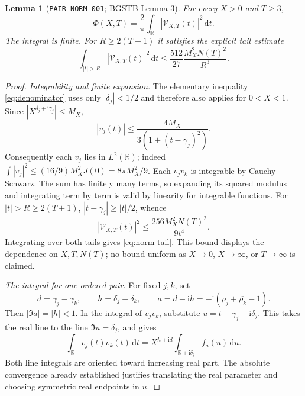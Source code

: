 \documentclass[11pt]{article}
\newtheorem{lemma}{Lemma}
\newcommand{\dd}{\,\mathrm d}
\newcommand{\ii}{\mathrm i}
\newcommand{\VS}{\mathcal V}
\begin{document}
\begin{lemma}[\texttt{PAIR-NORM-001}; BGSTB Lemma 3]\label{lem:pair-norm}
For every \(X>0\) and \(T\geq3\),
\begin{equation}\label{eq:pair-norm}
 \Phi(X,T)=\frac2\pi\int_{\mathbb R}|\VS_{X,T}(t)|^2\dd t.
\end{equation}
The integral is finite. For \(R\geq2(T+1)\) it satisfies the explicit
tail estimate
\begin{equation}\label{eq:norm-tail}
 \int_{|t|>R}|\VS_{X,T}(t)|^2\dd t
 \leq\frac{512}{27}\frac{M_X^2N(T)^2}{R^3}.
\end{equation}
\end{lemma}
\begin{proof}
\textit{Integrability and finite expansion.}
The elementary inequality \eqref{eq:denominator} uses only
\(|\delta_j|<1/2\) and therefore also applies for \(0<X<1\).
Since \(|X^{\delta_j+\ii\gamma_j}|\leq M_X\),
\[
 |v_j(t)|\leq\frac{4M_X}{3(1+(t-\gamma_j)^2)}.
\]
Consequently each \(v_j\) lies in \(L^2(\mathbb R)\); indeed
\(\int|v_j|^2\leq(16/9)M_X^2J(0)=8\pi M_X^2/9\).
Each \(v_j\overline{v_k}\) is integrable by Cauchy--Schwarz.
The sum has finitely many terms, so expanding its squared modulus and
integrating term by term is valid by linearity for integrable functions.
For \(|t|>R\geq2(T+1)\), \(|t-\gamma_j|\geq|t|/2\), whence
\[
 |\VS_{X,T}(t)|^2\leq\frac{256M_X^2N(T)^2}{9t^4}.
\]
Integrating over both tails gives \eqref{eq:norm-tail}.
This bound displays the dependence on \(X,T,N(T)\); no bound uniform
as \(X\to0\), \(X\to\infty\), or \(T\to\infty\) is claimed.

\textit{The integral for one ordered pair.}
For fixed \(j,k\), set
\[
 d=\gamma_j-\gamma_k,\qquad h=\delta_j+\delta_k,\qquad
 a=d-\ii h=-\ii(\rho_j+\overline{\rho_k}-1).
\]
Then \(|\Im a|=|h|<1\). In the integral of
\(v_j\overline{v_k}\), substitute \(u=t-\gamma_j+\ii\delta_j\).
This takes the real line to the line \(\Im u=\delta_j\), and gives
\begin{equation}\label{eq:norm-shifted-line}
 \int_{\mathbb R}v_j(t)\overline{v_k(t)}\dd t
 =X^{h+\ii d}\int_{\mathbb R+\ii\delta_j}f_a(u)\dd u.
\end{equation}
Both line integrals are oriented toward increasing real part.
The absolute convergence already established justifies translating the
real parameter and choosing symmetric real endpoints in \(u\).


\end{proof}
\end{document}
